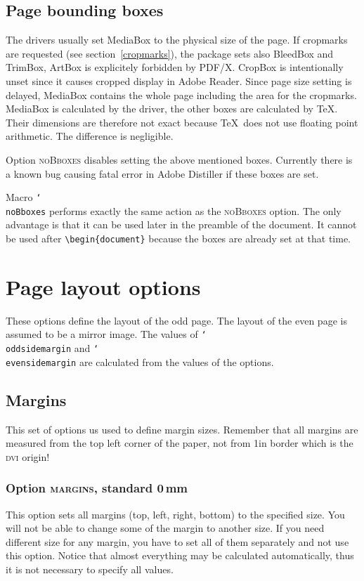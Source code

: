 \documentclass[11pt]{article}
\def\mg#1{\ifvmode\leavevmode\fi\marginpar{\texttt{#1}}\ignorespaces}
\def\cmg#1{\mg{\char`\\#1}}
\def\omg#1{\ifvmode\leavevmode\fi\marginpar{\raggedright\hspace{0pt}\opt{#1}}\ignorespaces}
\def\opt#1{\texorpdfstring{\textmd{\textsc{#1}}}{#1}}
\DeclareRobustCommand\cmd[1]{\texttt{\char`\\#1}}
\let\zwcomma\,
\def\,{\texorpdfstring{\zwcomma}{}}
\begin{document}
\subsection{Page bounding boxes}\label{Bboxes}
The drivers usually set MediaBox to the physical size of the page. If cropmarks are requested (see
section~\ref{cropmarks}), the package sets also BleedBox and TrimBox, ArtBox is explicitely
forbidden by PDF/X. CropBox is
intentionally unset since it causes cropped display in Adobe Reader. Since page size setting is
delayed, MediaBox contains the whole page including the area for the cropmarks. MediaBox is
calculated by the driver, the other boxes are calculated by \TeX. Their dimensions are therefore
not exact because \TeX\ does not use floating point arithmetic. The difference is negligible.

\omg{noBboxes}
Option \opt{noBboxes} disables setting the above mentioned boxes. Currently there is a known bug
causing fatal error in Adobe Distiller if these boxes are set.

\cmg{noBboxes}
Macro \cmd{noBboxes} performs exactly the same action as the \opt{noBboxes} option. The only
advantage is that it can be used later in the preamble of the document. It cannot be used after
\verb.\begin{document}. because the boxes are already set at that time.

\section{Page layout options}
These options define the layout of the odd page. The layout of the even page is assumed to be a mirror image.
The values of \cmd{oddsidemargin} and \cmd{evensidemargin} are calculated from the values of the options.

\subsection{Margins}
This set of options us used to define margin sizes.
Remember that all margins are measured from the top left corner of the paper, not from 1in border which is
the \textsc{dvi} origin!

\subsubsection{Option \opt{margins}, standard 0\,mm}
\omg{margins}
This option sets all margins (top, left, right, bottom) to the specified size. You will not be able to change
some of the margin to another size. If you need different size for any margin, you have to set all of them
separately and not use this option. Notice that almost everything may be calculated automatically, thus it is
not necessary to specify all values.
\end{document}
